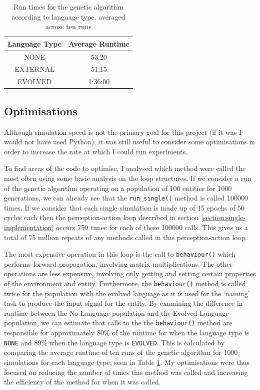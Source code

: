\documentclass[12pt,a4paper,twoside,openright]{report}
\begin{document}
\begin{table}[t]
\centering
 \begin{tabular}{ c | c}
 \bf{Language Type} & \bf{Average Runtime} \\ [0.5ex] 
 \hline
NONE & 53:20 \\
EXTERNAL & 51:15\\
EVOLVED & 1:36:00 \\
\end{tabular}
\caption{Run times for the genetic algorithm according to language type, averaged across ten runs}
\label{table:runtimes}
\end{table}

\subsection{Optimisations}\label{section:optimisations}

Although simulation speed is not the primary goal for this project (if it was I would not have used Python), it was still useful to consider some optimisations in order to increase the rate at which I could run experiments.

To find areas of the code to optimise, I analysed which method were called the most often using some basic analysis on the loop structures. If we consider a run of the genetic algorithm operating on a population of 100 entities for 1000 generations, we can already see that the \texttt{run\_single()} method is called 100000 times. If we consider that each single simulation is made up of 15 epochs of 50 cycles each then the perception-action loop described in section \ref{section:single-implementation} occurs 750 times for each of these 100000 calls. This gives us a total of 75 million repeats of any methods called in this perception-action loop.

The most expensive operation in this loop is the call to \texttt{behaviour()} which performs forward propagation, involving matrix multiplications. The other operations are less expensive, involving only getting and setting certain properties of the environment and entity. Furthermore, the \texttt{behaviour()} method is called twice for the population with the evolved language as it is used for the `naming' task to produce the input signal for the entity. By examining the difference in runtime between the No Language population and the Evolved Language population, we can estimate that calls to the the \texttt{behaviour()} method are responsible for approximately 80\% of the runtime for when the language type is \texttt{NONE} and 89\% when the language type is \texttt{EVOLVED}. This is calculated by comparing the average runtime of ten runs of the genetic algorithm for 1000 simulations for each language type, seen in Table \ref{table:runtimes}. My optimisations were thus focused on reducing the number of times this method was called and increasing the efficiency of the method for when it was called.
\end{document}
